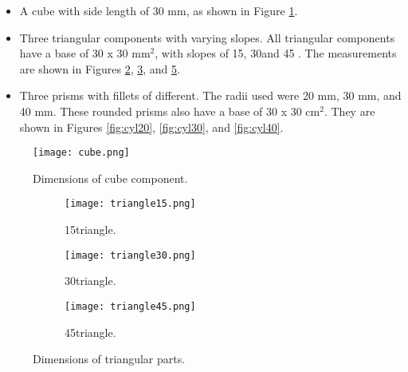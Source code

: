 \documentclass[../main.tex]{subfiles}
\begin{document}
\begin{itemize}
  \item A cube with side length of 30 mm, as shown in Figure \ref{fig:cube}.
  \item Three triangular components with varying slopes. All triangular components have a base of 30 x 30 mm$^2$, with slopes of 15\degree, 30\degree and 45 \degree. The measurements are shown in Figures \ref{fig:tri15}, \ref{fig:tri30},  and \ref{fig:tri45}.
  \item Three prisms with fillets of different. The radii used were 20 mm, 30 mm, and 40 mm. These rounded prisms also have a base of 30 x 30 cm$^2$. They are shown in Figures \ref{fig:cyl20}, \ref{fig:cyl30}, and \ref{fig:cyl40}.
\end{itemize}

\begin{figure}
	\begin{center}
		\texttt{[image: cube.png]}
	\end{center}
	\caption{Dimensions of cube component.}\label{fig:cube}
\end{figure}

\begin{figure}
  \begin{subfigure}{0.3\textwidth}
    \begin{center}
		\texttt{[image: triangle15.png]}
  \end{center}
    \caption{15\degree triangle.}\label{fig:tri15}
  \end{subfigure}
  \begin{subfigure}{0.3\textwidth}
      \begin{center}
      \texttt{[image: triangle30.png]}
      \end{center}
      \caption{30\degree triangle.}\label{fig:tri30}
  \end{subfigure}
  \begin{subfigure}{0.3\textwidth}
      \begin{center}
      \texttt{[image: triangle45.png]}
      \end{center}
      \caption{45\degree triangle.}\label{fig:tri45}
  \end{subfigure}
  \caption{Dimensions of triangular parts.}
\end{figure}
\end{document}
